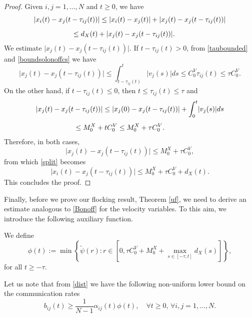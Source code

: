 \documentclass[11pt]{article}
\begin{document}
    \begin{proof}
   	Given $i,j=1,\dots,N$ and $t\geq0$, we have
   	\begin{equation}\label{split}
   		\begin{array}{l}
   			\vspace{0.3cm}\displaystyle{\lvert x_{i}(t)-x_{j}(t-\tau_{ij}(t))\rvert\leq \lvert x_{i}(t)-x_{j}(t)\rvert+\lvert x_{j}(t)-x_{j}(t-\tau_{ij}(t))\rvert}\\
   			\displaystyle{\hspace{2cm}\leq d_{X}(t)+\lvert x_{j}(t)-x_{j}(t-\tau_{ij}(t))\rvert.}
   		\end{array}
   	\end{equation}
   	We estimate $\lvert x_{j}(t)-x_{j}(t-\tau_{ij}(t))\rvert.$ If $t-\tau_{ij}(t)>0$, from \eqref{taubounded} and \eqref{boundsolonoffcs} we have
   	$$\lvert x_{j}(t)-x_{j}(t-\tau_{ij}(t))\rvert\leq \int_{t-\tau_{ij}(t)}^{t}\lvert v_{j}(s)\rvert ds\leq C^{V}_{0}\tau_{ij}(t)\leq \tau C^{V}_{0}.$$
   	On the other hand, if $t-\tau_{ij}(t)\leq 0$, then $t\leq \tau_{ij}(t)\leq \tau$ and 
   	$$\begin{array}{l}
   		\vspace{0.3cm}\displaystyle{\lvert x_{j}(t)-x_{j}(t-\tau_{ij}(t))\rvert\leq\lvert x_j(0)-x_j(t-\tau_{ij}(t))\rvert+ \int_{0}^{t}\lvert v_{j}(s)\rvert ds}\\
   		\displaystyle{\hspace{2cm}\leq M^{X}_{0}+t C^{V}_{0}\leq M^{X}_0+\tau C^{V}_{0}.}
   	\end{array}$$
   	Therefore, in both cases,
   	$$\lvert x_{j}(t)-x_{j}(t-\tau_{ij}(t))\rvert\leq M^{X}_0+\tau C^{V}_{0},$$
   	from which \eqref{split} becomes
   	$$	\lvert x_{i}(t)-x_{j}(t-\tau_{ij}(t))\rvert\leq M^{X}_0+\tau C^{V}_{0}+d_{X}(t).$$
   	This concludes the proof.
   \end{proof}
Finally, before we prove our flocking result, Theorem \ref{uf}, we need to derive an estimate {analogous to \eqref{Bonoff} for the velocity variables.} To this aim, we introduce the following auxiliary function.
	\begin{defn}
		We define
		$$\phi(t):=\min\left\{\tilde\psi(r):r\in \left[0,\tau C^{V}_{0}+M^{X}_{0}+\max_{s\in[-\tau,t] }d_{X}(s)\right]\right\},$$
		for all $t\geq -\tau$.
	\end{defn}
	\begin{oss}
		Let us note that from \eqref{dist} we have the following non-uniform lower bound on the communication rates
		\begin{equation}\label{weightlowerbound}
			b_{ij}(t)\geq \frac{1}{N-1}{\alpha_{ij}(t)}\phi(t),\quad \forall t\geq 0,\,\forall i,j=1,\dots,N.
		\end{equation}
	\end{oss}
	
\end{document}
